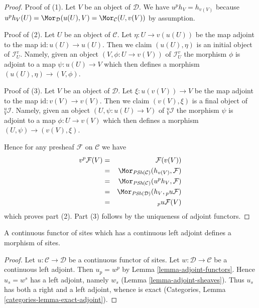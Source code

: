 \begin{proof}
Proof of (1). Let $V$ be an object of $\mathcal{D}$. We have
$u^ph_V = h_{v(V)}$ because
$u^ph_V(U) = \Mor_\mathcal{D}(u(U), V) = \Mor_\mathcal{C}(U, v(V))$
by assumption.

\medskip\noindent
Proof of (2). Let $U$ be an object of $\mathcal{C}$. Let
$\eta : U \to v(u(U))$ be the map adjoint to the map
$\text{id} : u(U) \to u(U)$. Then we claim $(u(U), \eta)$
is an initial object of $\mathcal{I}_U^v$. Namely, given
an object $(V, \phi : U \to v(V))$ of $\mathcal{I}_U^v$
the morphism $\phi$ is adjoint to a map $\psi : u(U) \to V$
which then defines a morphism $(u(U), \eta) \to (V, \phi)$.

\medskip\noindent
Proof of (3). Let $V$ be an object of $\mathcal{D}$. Let
$\xi : u(v(V)) \to V$ be the map adjoint to the map
$\text{id} : v(V) \to v(V)$. Then we claim $(v(V), \xi)$
is a final object of ${}_V^u\mathcal{I}$. Namely, given
an object $(U, \psi : u(U) \to V)$ of ${}_V^u\mathcal{I}$
the morphism $\psi$ is adjoint to a map $\phi : U \to v(V)$
which then defines a morphism $(U, \psi) \to (v(V), \xi)$.

\medskip\noindent
Hence for any presheaf $\mathcal{F}$ on $\mathcal{C}$ we have
\begin{eqnarray*}
v^p\mathcal{F}(V)
& = &
\mathcal{F}(v(V)) \\
& = &
\Mor_{\textit{PSh}(\mathcal{C})}(h_{v(V)}, \mathcal{F}) \\
& = &
\Mor_{\textit{PSh}(\mathcal{C})}(u^ph_V, \mathcal{F}) \\
& = &
\Mor_{\textit{PSh}(\mathcal{D})}(h_V, {}_pu\mathcal{F}) \\
& = &
{}_pu\mathcal{F}(V)
\end{eqnarray*}
which proves part (2). Part (3) follows by the uniqueness of adjoint functors.
\end{proof}

\begin{lemma}
\label{lemma-continuous-with-continuous-left-adjoint}
A continuous functor of sites which has a continuous left adjoint
defines a morphism of sites.
\end{lemma}

\begin{proof}
Let $u : \mathcal{C} \to \mathcal{D}$ be a continuous functor of sites.
Let $w : \mathcal{D} \to \mathcal{C}$ be a continuous left adjoint.
Then $u_p = w^p$ by Lemma \ref{lemma-adjoint-functors}.
Hence $u_s = w^s$ has a left adjoint, namely $w_s$
(Lemma \ref{lemma-adjoint-sheaves}). Thus $u_s$ has both a right and a
left adjoint, whence is exact
(Categories, Lemma \ref{categories-lemma-exact-adjoint}).
\end{proof}




